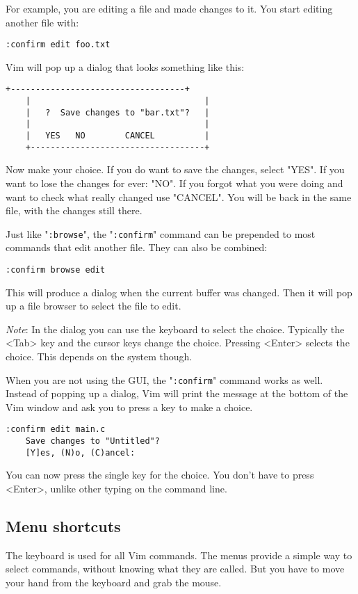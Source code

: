 For example, you are editing a file and made changes to it.
You start editing another file with:

\begin{Verbatim}[samepage=true]
 :confirm edit foo.txt
\end{Verbatim}

Vim will pop up a dialog that looks something like this:

\begin{Verbatim}[samepage=true]
    +-----------------------------------+
    |                                   |
    |   ?  Save changes to "bar.txt"?   |
    |                                   |
    |   YES   NO        CANCEL          |
    +-----------------------------------+
\end{Verbatim}

Now make your choice.
If you do want to save the changes, select "YES".
If you want to lose the changes for ever: "NO".
If you forgot what you were doing and want to check what really changed use "CANCEL".
You will be back in the same file, with the changes still there.

Just like "\texttt{:browse}", the "\texttt{:confirm}" command can be prepended to most commands that edit another file.
They can also be combined:

\begin{Verbatim}[samepage=true]
 :confirm browse edit
\end{Verbatim}

This will produce a dialog when the current buffer was changed.
Then it will pop up a file browser to select the file to edit.

\emph{Note}: In the dialog you can use the keyboard to select the choice.
Typically the <Tab> key and the cursor keys change the choice.
Pressing <Enter> selects the choice.
This depends on the system though.

When you are not using the GUI, the "\texttt{:confirm}" command works as well.
Instead of popping up a dialog, Vim will print the message at the bottom of the Vim window and ask you to press a key to make a choice.

\begin{Verbatim}[samepage=true]
 :confirm edit main.c
    Save changes to "Untitled"? 
    [Y]es, (N)o, (C)ancel:  
\end{Verbatim}

You can now press the single key for the choice.
You don't have to press <Enter>, unlike other typing on the command line.
\subsection{Menu shortcuts}
The keyboard is used for all Vim commands.
The menus provide a simple way to select commands, without knowing what they are called.
But you have to move your hand from the keyboard and grab the mouse.

